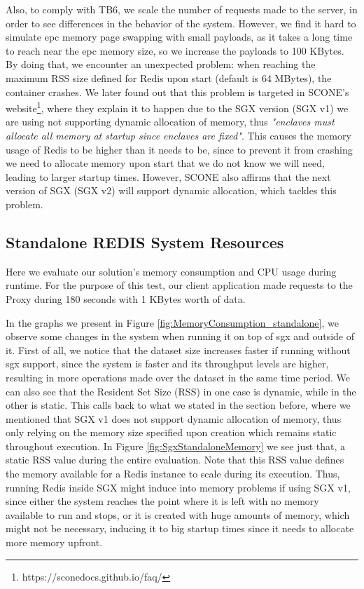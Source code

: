 Also, to comply with TB6, we scale the number of requests made to the server, in order to see differences in the behavior of the system. However, we find it hard to simulate \gls{epc} memory page swapping with small payloads, as it takes a long time to reach near the \gls{epc} memory size, so we increase the payloads to 100 KBytes. By doing that, we encounter an unexpected problem: when reaching the maximum RSS size defined for Redis upon start (default is 64 MBytes), the container crashes. We later found out that this problem is targeted in SCONE's website\footnote{https://sconedocs.github.io/faq/}, where they explain it to happen due to the SGX version (SGX v1) we are using not supporting dynamic allocation of memory, thus \textit{"enclaves must allocate all memory at startup since enclaves are fixed"}. This causes the memory usage of Redis to be higher than it needs to be, since to prevent it from crashing we need to allocate memory upon start that we do not know we will need, leading to larger startup times. However, SCONE also affirms that the next version of SGX (SGX v2) will support dynamic allocation, which tackles this problem. 


\subsection{Standalone REDIS System Resources}
\label{ssec:SingleRedis_MemCPU}

Here we evaluate our solution's memory consumption and CPU usage during runtime. 
For the purpose of this test, our client application made requests to the Proxy during 180 seconds with 1 KBytes worth of data.  

In the graphs we present in Figure \ref{fig:MemoryConsumption_standalone}, we observe some changes in the system when running it on top of \gls{sgx} and outside of it. First of all, we notice that the dataset size increases faster if running without \gls{sgx} support, since the system is faster and its throughput levels are higher, resulting in more operations made over the dataset in the same time period. We can also see that the Resident Set Size (RSS) in one case is dynamic, while in the other is static. This calls back to what we stated in the section before, where we mentioned that SGX v1 does not support dynamic allocation of memory, thus only relying on the memory size specified upon creation which remains static throughout execution. In Figure \ref{fig:SgxStandaloneMemory} we see just that, a static RSS value during the entire evaluation. Note that this RSS value defines the memory available for a Redis instance to scale during its execution. Thus, running Redis inside SGX might induce into memory problems if using SGX v1, since either the system reaches the point where it is left with no memory available to run and stops, or it is created with huge amounts of memory, which might not be necessary, inducing it to big startup times since it needs to allocate more memory upfront.

